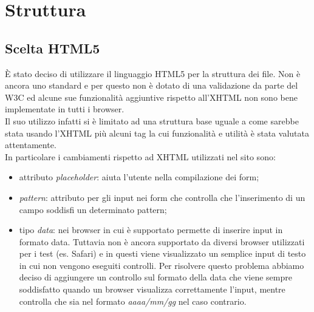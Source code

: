 \section{Struttura}
	\subsection{Scelta HTML5}
	È stato deciso di utilizzare il linguaggio HTML5 per la struttura dei file. Non è ancora uno standard e per questo non è dotato di una validazione da parte del W3C ed alcune sue funzionalità aggiuntive rispetto all'XHTML non sono bene implementate in tutti i browser.\\
	Il suo utilizzo infatti si è limitato ad una struttura base uguale a come sarebbe stata usando l'XHTML più alcuni tag  la cui funzionalità e utilità è stata valutata attentamente. \\In particolare i cambiamenti rispetto ad XHTML utilizzati nel sito sono:
	\begin{itemize}
		\item attributo \emph{placeholder}: aiuta l'utente nella compilazione dei form;
		\item \emph{pattern}: attributo per gli input nei form che controlla che l'inserimento di un campo soddisfi un determinato pattern;
		\item tipo \emph{data}: nei browser in cui è supportato permette di inserire input in formato data. Tuttavia non è ancora supportato da diversi browser utilizzati per i test (es. Safari) e in questi viene visualizzato un semplice input di testo in cui non vengono eseguiti controlli. Per risolvere questo problema abbiamo deciso di aggiungere un controllo sul formato della data che viene sempre soddisfatto quando un browser visualizza correttamente l'input, mentre controlla che sia nel formato \emph{aaaa/mm/gg} nel caso contrario.
	\end{itemize}	

		


